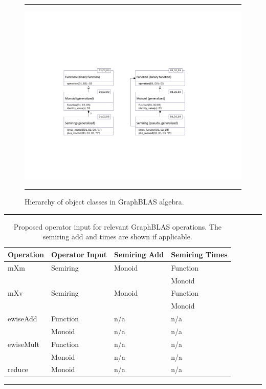 \begin{figure}[htb]
	\hrule
	\begin{center}
		\includegraphics[width=1.0\linewidth,trim=1.5in 2in 1.5in 2in]{Algebra_Hierarchy.pdf}
	\end{center}
	\caption{Hierarchy of object classes in GraphBLAS algebra.}
	\label{Fig:AlgebraHierarchyProposed}
	\hrule
\end{figure}

\begin{table}
	\hrule
	\begin{center}
		\caption{Proposed operator input for relevant GraphBLAS operations. The semiring add and times are shown if applicable.}
		\label{Tab:OperatorInputType}
		\begin{tabular}{l|l|l|l}
			Operation	& Operator Input & Semiring Add & Semiring Times  \\ \hline
			mXm & Semiring & Monoid & Function \\
			&  &  & Monoid \\
			mXv & Semiring & Monoid & Function  \\
			&  &  & Monoid  \\
			ewiseAdd &  Function & n/a & n/a  \\
			& Monoid & n/a & n/a  \\
			ewiseMult & Function & n/a & n/a  \\
			& Monoid & n/a & n/a  \\
			reduce & Monoid & n/a & n/a \\
		\end{tabular}
	\end{center}
	\hrule
\end{table}

